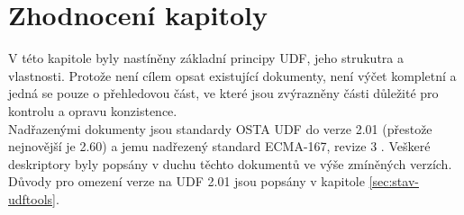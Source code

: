 \section{Zhodnocení kapitoly}
V této kapitole byly nastíněny základní principy UDF, jeho strukutra a vlastnosti. Protože není cílem opsat existující dokumenty, není výčet kompletní a jedná se pouze o přehledovou část, ve které jsou zvýrazněny části důležité pro kontrolu a opravu konzistence.\\
Nadřazenými dokumenty jsou standardy OSTA UDF do verze 2.01 \cite{osta-udf-0201} (přestože nejnovější je 2.60) a jemu nadřezený standard ECMA-167, revize 3 \cite{ecma-167}. Veškeré deskriptory byly popsány v duchu těchto dokumentů ve výše zmíněných verzích.\\
Důvody pro omezení verze na UDF 2.01 jsou popsány v kapitole \ref{sec:stav-udftools}.

